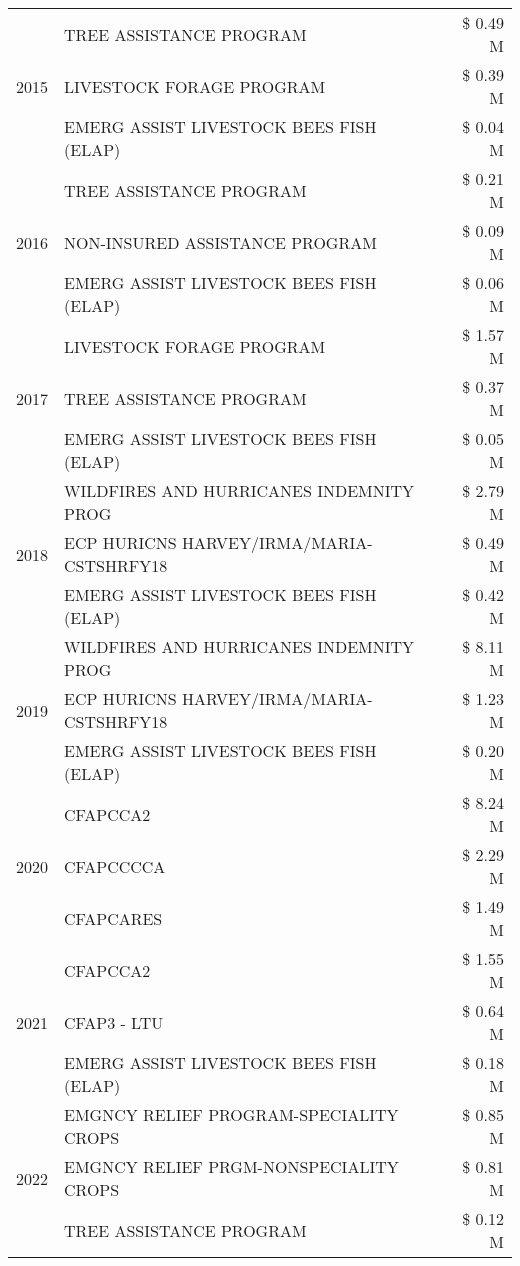 \begin{tabular}{llr}
\cline{1-3}
\multirow[t]{3}{*}{2015} & TREE ASSISTANCE PROGRAM & \$ 0.49 M \\
 & LIVESTOCK FORAGE PROGRAM & \$ 0.39 M \\
 & EMERG ASSIST LIVESTOCK BEES FISH (ELAP) & \$ 0.04 M \\
\cline{1-3}
\multirow[t]{3}{*}{2016} & TREE ASSISTANCE PROGRAM & \$ 0.21 M \\
 & NON-INSURED ASSISTANCE PROGRAM & \$ 0.09 M \\
 & EMERG ASSIST LIVESTOCK BEES FISH (ELAP) & \$ 0.06 M \\
\cline{1-3}
\multirow[t]{3}{*}{2017} & LIVESTOCK FORAGE PROGRAM & \$ 1.57 M \\
 & TREE ASSISTANCE PROGRAM & \$ 0.37 M \\
 & EMERG ASSIST LIVESTOCK BEES FISH (ELAP) & \$ 0.05 M \\
\cline{1-3}
\multirow[t]{3}{*}{2018} & WILDFIRES AND HURRICANES INDEMNITY PROG & \$ 2.79 M \\
 & ECP HURICNS HARVEY/IRMA/MARIA-CSTSHRFY18 & \$ 0.49 M \\
 & EMERG ASSIST LIVESTOCK BEES FISH (ELAP) & \$ 0.42 M \\
\cline{1-3}
\multirow[t]{3}{*}{2019} & WILDFIRES AND HURRICANES INDEMNITY PROG & \$ 8.11 M \\
 & ECP HURICNS HARVEY/IRMA/MARIA-CSTSHRFY18 & \$ 1.23 M \\
 & EMERG ASSIST LIVESTOCK BEES FISH (ELAP) & \$ 0.20 M \\
\cline{1-3}
\multirow[t]{3}{*}{2020} & CFAPCCA2 & \$ 8.24 M \\
 & CFAPCCCCA & \$ 2.29 M \\
 & CFAPCARES & \$ 1.49 M \\
\cline{1-3}
\multirow[t]{3}{*}{2021} & CFAPCCA2 & \$ 1.55 M \\
 & CFAP3 - LTU & \$ 0.64 M \\
 & EMERG ASSIST LIVESTOCK BEES FISH (ELAP) & \$ 0.18 M \\
\cline{1-3}
\multirow[t]{3}{*}{2022} & EMGNCY RELIEF PROGRAM-SPECIALITY CROPS & \$ 0.85 M \\
 & EMGNCY RELIEF PRGM-NONSPECIALITY CROPS & \$ 0.81 M \\
 & TREE ASSISTANCE PROGRAM & \$ 0.12 M \\
\cline{1-3}
\bottomrule
\end{tabular}
